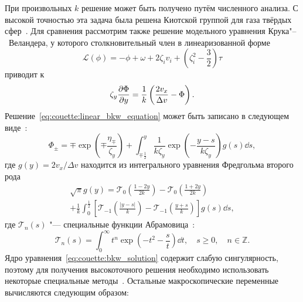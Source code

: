 При произвольных \(k\) решение может быть получено путём численного анализа.
С высокой точностью эта задача была решена Киотской группой для газа твёрдых сфер~\cite{Ohwada1990}.
Для сравнения рассмотрим также решение модельного уравнения Крука"--~Веландера,
у которого столкновительный член в линеаризованной форме
\begin{equation}\label{eq:linear_bkw}
    \mathcal{L}(\phi) = -\phi + \omega + 2\zeta_i v_i + \left(\zeta_i^2-\frac32\right)\tau
\end{equation}
приводит к
\begin{equation}\label{eq:couette:linear_bkw_equation}
    \zeta_y \pder[\Phi]{y} = \frac1{k}\left( \frac{2v_x}{\Delta{v}} - \Phi \right).
\end{equation}
Решение~\eqref{eq:couette:linear_bkw_equation} может быть записано в следующем виде~\cite{Willis1962}:
\begin{equation}\label{eq:couette:bkw_solution}
    \Phi_\pm = \mp \exp\left(\mp\frac{\eta_\mp}{\zeta_y}\right) +
        \int_{\mp\frac12}^y \frac1{k\zeta_y} \exp \left(-\frac{y-s}{k\zeta_y}\right) g(s) \dd{s},
\end{equation}
где \(g(y) = 2v_x/\Delta v\) находится из интегрального уравнения Фредгольма второго рода
\begin{multline}\label{eq:couette:bkw_g_equation}
    \sqrt{\pi} g(y) = \mathcal{T}_0 \left(\frac{1-2y}{2k}\right) - \mathcal{T}_0 \left(\frac{1+2y}{2k}\right) \\
        + \frac1k \int_0^{\frac12} \left[ \mathcal{T}_{-1}\left(\frac{|y-s|}{k}\right)
        - \mathcal{T}_{-1}\left(\frac{y+s}{k}\right) \right] g(s) \dd{s},
\end{multline}
где \(\mathcal{T}_n(s)\) "--- специальные функции Абрамовица~\cite{Abramowitz1972}:
\begin{equation}\label{eq:Abramowitz}
    \mathcal{T}_n(s) = \int_0^\infty t^n \exp\left(-t^2-\frac{s}{t}\right) \dd t,
    \quad s\ge0, \quad n \in \mathbb{Z}.
\end{equation}
Ядро уравнения~\eqref{eq:couette:bkw_solution} содержит слабую сингулярность,
поэтому для получения высокоточного решения необходимо использовать некоторые специальные методы~\cite{Luo2015, Luo2016}.
Остальные макроскопические переменные вычисляются следующим образом:
